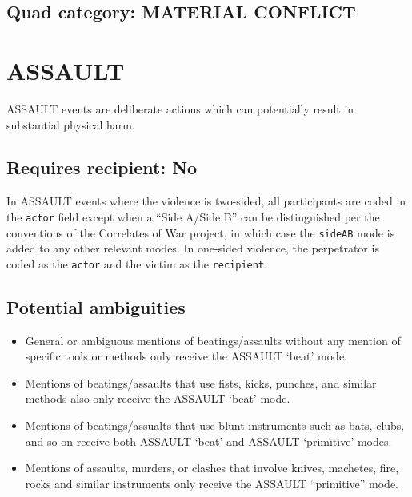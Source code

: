 \documentclass[11pt]{report}
\newcommand{\plcat}[1]{\textsf{#1}}
\newcommand{\plmod}[1]{\texttt{#1}}
\newcommand{\txt}[1]{\texttt{#1}}
\begin{document}
\subsection{Quad category: MATERIAL CONFLICT}

\newpage


\section{ASSAULT}

\plcat{ASSAULT} events are deliberate actions which can potentially result in substantial physical harm.

\subsection{Requires recipient: No}

In \plcat{ASSAULT} events where the violence is two-sided, all participants are coded in the \txt{actor} field except when a ``Side A/Side B'' can be distinguished per the conventions of the Correlates of War project, in which case the \plmod{sideAB} mode is added to any other relevant modes. In one-sided violence, the perpetrator is coded as the \txt{actor} and the victim as the \txt{recipient}.


\subsection{Potential ambiguities}
\begin{itemize}
\item General or ambiguous mentions of beatings/assaults without any mention of specific tools or methods only receive the \plcat{ASSAULT} `beat' mode.

\item Mentions of beatings/assaults that use fists, kicks, punches, and similar methods also only receive the  \plcat{ASSAULT} `beat' mode.

\item Mentions of beatings/assualts that use blunt instruments such as bats, clubs, and so on receive both \plcat{ASSAULT}  `beat' and  \plcat{ASSAULT} `primitive' modes.
\item Mentions of assaults, murders, or clashes that involve knives, machetes, fire, rocks and similar instruments only receive the  \plcat{ASSAULT} ``primitive'' mode.
\end{itemize}
\end{document}
